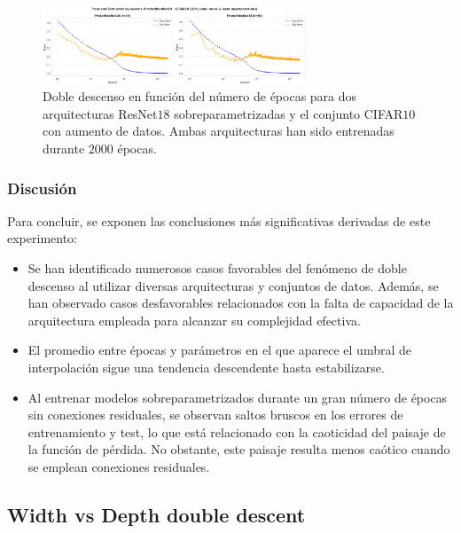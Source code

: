 \begin{figure}[h]
    \centering
    \includegraphics[width=0.7\textwidth]{img/experiments/epoch-wisePreActResNet18(45,64).png}
    \caption[Doble descenso en función del número de épocas para dos arquitecturas ResNet$18$ sobreparametrizadas y el conjunto CIFAR$10$.]{Doble descenso en función del número de épocas para dos arquitecturas ResNet$18$ sobreparametrizadas y el conjunto CIFAR$10$ con aumento de datos. Ambas arquitecturas han sido entrenadas durante $2000$ épocas.}\label{fig:epoch-wisePreActResNet18over}
\end{figure}

\subsubsection{Discusión}\label{subsubsec:discusion-model-epoch}

Para concluir, se exponen las conclusiones más significativas derivadas de este experimento:

\begin{itemize}
    \item Se han identificado numerosos casos favorables del fenómeno de doble descenso al utilizar diversas arquitecturas y conjuntos de datos. Además, se han observado casos desfavorables relacionados con la falta de capacidad de la arquitectura empleada para alcanzar su complejidad efectiva.
    \item El promedio entre épocas y parámetros en el que aparece el umbral de interpolación sigue una tendencia descendente hasta estabilizarse.
    \item Al entrenar modelos sobreparametrizados durante un gran número de épocas sin conexiones residuales, se observan saltos bruscos en los errores de entrenamiento y test, lo que está relacionado con la caoticidad del paisaje de la función de pérdida. No obstante, este paisaje resulta menos caótico cuando se emplean conexiones residuales.
\end{itemize}

\subsection{Width vs Depth double descent}\label{subsec:width-depth}

